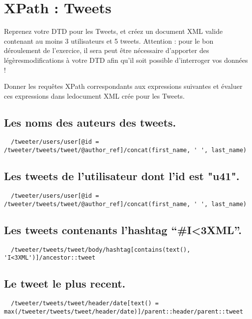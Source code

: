 \chapter{XPath : Tweets}

Reprenez votre DTD pour les Tweets, et créez un document XML valide contenant au moins 3 utilisateurs et 5 tweets. Attention : pour le bon déroulement de l’exercice, il sera peut être nécessaire d’apporter des légèresmodifications à votre DTD afin qu’il soit possible d’interroger vos données !

Donner  les  requêtes  XPath  correspondants  aux  expressions  suivantes  et  évaluer  ces  expressions  dans  ledocument XML crée pour les Tweets.

\section{Les noms des auteurs des tweets.}
\begin{verbatim}
  /tweeter/users/user[@id = /tweeter/tweets/tweet/@author_ref]/concat(first_name, ' ', last_name)
\end{verbatim}

\section{Les tweets de l’utilisateur dont l’id est "u41".}
\begin{verbatim}
  /tweeter/users/user[@id = /tweeter/tweets/tweet/@author_ref]/concat(first_name, ' ', last_name)
\end{verbatim}

\section{Les tweets contenants l’hashtag “\#I<3XML”.}
\begin{verbatim}
  /tweeter/tweets/tweet/body/hashtag[contains(text(), 'I<3XML')]/ancestor::tweet
\end{verbatim}

\section{Le tweet le plus recent.}
\begin{verbatim}
  /tweeter/tweets/tweet/header/date[text() = max(/tweeter/tweets/tweet/header/date)]/parent::header/parent::tweet
\end{verbatim}

